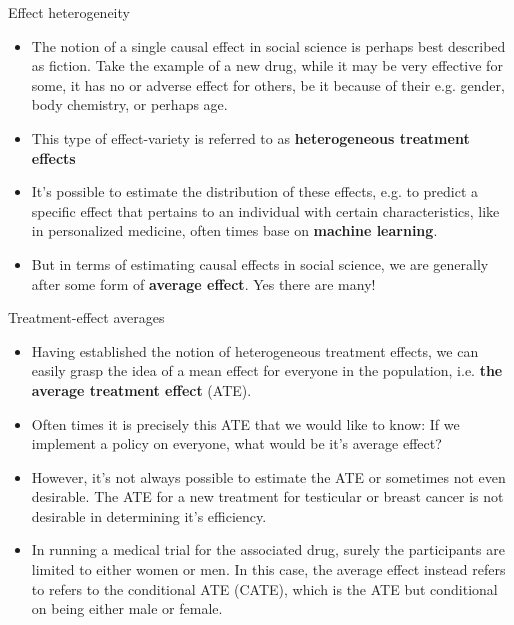 \documentclass[notes,11pt, aspectratio=169]{beamer}
\begin{document}
\begin{frame}{Effect heterogeneity}
\begin{itemize}
    \item The notion of a single causal effect in social science is  perhaps best described as fiction. Take the example of a new drug, while it may be very effective for some, it has no or adverse effect for others, be it because of their e.g. gender, body chemistry, or perhaps age. 
    \item This type of effect-variety is referred to as \textbf{heterogeneous treatment effects}
    \item It's possible to estimate the distribution of these effects, e.g. to predict a specific effect that pertains to an individual with certain characteristics, like in personalized medicine, often times base on \textbf{machine learning}.
    \item But in terms of estimating causal effects in social science, we are generally after some form of \textbf{average effect}. Yes there are many!
\end{itemize}
\end{frame}

\begin{frame}{Treatment-effect averages}
\begin{itemize}
    \item Having established the notion of heterogeneous treatment effects, we can easily grasp the idea of a mean effect for everyone in the population, i.e. \textbf{the average treatment effect} (ATE).
   
    \item Often times it is precisely this ATE that we would like to know: If we implement a policy on everyone, what would be it's average effect?

    \item However, it's not always possible to estimate the ATE or sometimes not even desirable. The ATE for a new treatment for testicular or breast cancer is not desirable in determining it's efficiency.

    \item In running a medical trial for the associated drug, surely the participants are limited to either women or men. In this case, the average effect instead refers to refers to the conditional ATE (CATE), which is the ATE but conditional on being either male or female.
\end{itemize}
\end{frame}
\end{document}
